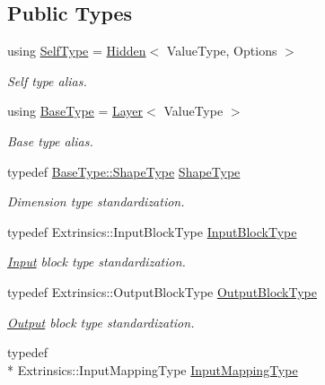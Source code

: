 \subsection*{Public Types}
\begin{DoxyCompactItemize}
\item 
using \hyperlink{classffnn_1_1layer_1_1_hidden_a48f525146f2e73caf51aa404f38cdb75}{Self\-Type} = \hyperlink{classffnn_1_1layer_1_1_hidden}{Hidden}$<$ Value\-Type, Options $>$
\begin{DoxyCompactList}\small\item\em Self type alias. \end{DoxyCompactList}\item 
using \hyperlink{classffnn_1_1layer_1_1_hidden_a6369d3e45b700c257076cd955d50f9c3}{Base\-Type} = \hyperlink{classffnn_1_1layer_1_1_layer}{Layer}$<$ Value\-Type $>$
\begin{DoxyCompactList}\small\item\em Base type alias. \end{DoxyCompactList}\item 
typedef \hyperlink{classffnn_1_1layer_1_1_layer_ae2f2d0063ab4b2c2a3a6ebf81f4ec32f}{Base\-Type\-::\-Shape\-Type} \hyperlink{classffnn_1_1layer_1_1_hidden_a567e902299b3355501393cf6c7b27c38}{Shape\-Type}
\begin{DoxyCompactList}\small\item\em Dimension type standardization. \end{DoxyCompactList}\item 
typedef Extrinsics\-::\-Input\-Block\-Type \hyperlink{classffnn_1_1layer_1_1_hidden_abd5a3b5c55984948f903fe88759efaf4}{Input\-Block\-Type}
\begin{DoxyCompactList}\small\item\em \hyperlink{classffnn_1_1layer_1_1_input}{Input} block type standardization. \end{DoxyCompactList}\item 
typedef Extrinsics\-::\-Output\-Block\-Type \hyperlink{classffnn_1_1layer_1_1_hidden_a9fd326932b57e1d86d86bdb168822727}{Output\-Block\-Type}
\begin{DoxyCompactList}\small\item\em \hyperlink{classffnn_1_1layer_1_1_output}{Output} block type standardization. \end{DoxyCompactList}\item 
typedef \\*
Extrinsics\-::\-Input\-Mapping\-Type \hyperlink{classffnn_1_1layer_1_1_hidden_ac518f2e2be1250c1af7b2f8574cadc8d}{Input\-Mapping\-Type}

\end{DoxyCompactItemize}
